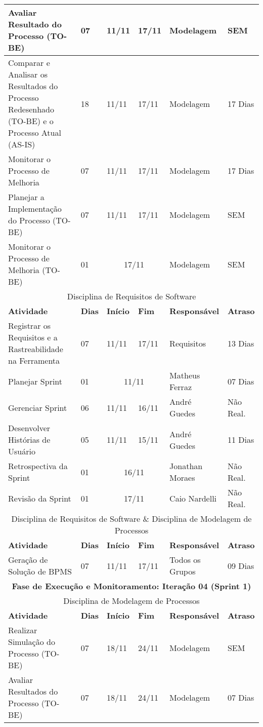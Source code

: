 \begin{center}
	\begin{tabular}{|m{10cm}|m{1cm}|m{1cm}|m{1cm}|m{4cm}|m{2cm}|}
	\hline
	Avaliar Resultado do Processo (TO-BE) & 07 & 11/11 & 17/11 & Modelagem & SEM \\ \hline
	Comparar e Analisar os Resultados do Processo Redesenhado (TO-BE) e o Processo Atual (AS-IS) & 18 & 11/11 & 17/11 & Modelagem & 17 Dias \\ \hline
	Monitorar o Processo de Melhoria & 07 & 11/11 & 17/11 & Modelagem & 17 Dias \\ \hline
	Planejar a Implementação do Processo (TO-BE) & 07 & 11/11 & 17/11 & Modelagem & SEM \\ \hline
	Monitorar o Processo de Melhoria (TO-BE) & 01 & \multicolumn{2}{c|}{17/11} & Modelagem & SEM \\ \hline
	\multicolumn{6}{|c|}{Disciplina de Requisitos de Software} \\
	\hline
	\textbf{Atividade} & \textbf{Dias} & \textbf{Início} & \textbf{Fim} & \textbf{Responsável} & \textbf{Atraso} \\ \hline
	Registrar os Requisitos e a Rastreabilidade na Ferramenta & 07 & 11/11 & 17/11 & Requisitos & 13 Dias \\ \hline
	Planejar Sprint & 01 & \multicolumn{2}{c|}{11/11} & Matheus Ferraz & 07 Dias \\ \hline
	Gerenciar Sprint & 06 & 11/11 & 16/11 & André Guedes & Não Real. \\ \hline
	Desenvolver Histórias de Usuário & 05 & 11/11 & 15/11 & André Guedes & 11 Dias \\ \hline
	Retrospectiva da Sprint & 01 & \multicolumn{2}{c|}{16/11} & Jonathan Moraes & Não Real. \\ \hline
	Revisão da Sprint & 01 & \multicolumn{2}{c|}{17/11} & Caio Nardelli & Não Real. \\ \hline
	\multicolumn{6}{|c|}{Disciplina de Requisitos de Software \& Disciplina de Modelagem de Processos} \\ \hline
	\textbf{Atividade} & \textbf{Dias} & \textbf{Início} & \textbf{Fim} & \textbf{Responsável} & \textbf{Atraso} \\ \hline
	Geração de Solução de BPMS & 07 & 11/11 & 17/11 & Todos os Grupos & 09 Dias \\ \hline
	\multicolumn{6}{|c|}{\textbf{Fase de Execução e Monitoramento: Iteração 04 (Sprint 1)}} \\
	\hline
	\multicolumn{6}{|c|}{Disciplina de Modelagem de Processos} \\
	\hline
	\textbf{Atividade} & \textbf{Dias} & \textbf{Início} & \textbf{Fim} & \textbf{Responsável} & \textbf{Atraso} \\ \hline
	Realizar Simulação do Processo (TO-BE) & 07 & 18/11 & 24/11 & Modelagem & SEM \\ \hline
	Avaliar Resultados do Processo (TO-BE) & 07 & 18/11 & 24/11 & Modelagem & 07 Dias \\ \hline
	\end{tabular}
\end{center}
